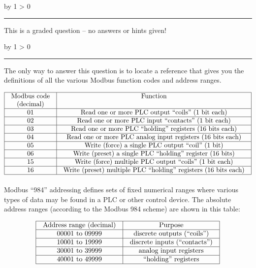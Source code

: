 \documentclass[12pt,a4paper]{article}
\def\svar{
           \advance\answnum by 1
           \ifnum \answnum > 0
                \hrule
                \vskip 3pt
                \leftline{Svar \the\answnum}
                \vskip 3pt \fi}
\def\notes{
           \advance\explnum by 1
           \ifnum \explnum > 0
                \hrule
                \vskip 3pt
                \leftline{Notes \the\explnum}
                \vskip 3pt \fi}
\begin{document}
\vfil
{}
\eject
\vskip 10pt \filbreak 





\svar{} 

This is a graded question -- no answers or hints given!

\vskip 10pt \filbreak 





\notes{} 

The only way to answer this question is to locate a reference that gives you the definitions of all the various Modbus function codes and address ranges.


$$\vbox{\offinterlineskip
\halign{\strut
\vrule \quad\hfil # \ \hfil & 
\vrule \quad\hfil # \ \hfil \vrule \cr
\noalign{\hrule}
%
Modbus code & Function \cr
(decimal) &  \cr
%
\noalign{\hrule}
%
01 & Read one or more PLC output ``coils'' (1 bit each) \cr
%
\noalign{\hrule}
%
02 & Read one or more PLC input ``contacts'' (1 bit each) \cr
%
\noalign{\hrule}
%
03 & Read one or more PLC ``holding'' registers (16 bits each) \cr
%
\noalign{\hrule}
%
04 & Read one or more PLC analog input registers (16 bits each) \cr
%
\noalign{\hrule}
%
05 & Write (force) a single PLC output ``coil'' (1 bit) \cr
%
\noalign{\hrule}
%
06 & Write (preset) a single PLC ``holding'' register (16 bits) \cr
%
\noalign{\hrule}
%
15 & Write (force) multiple PLC output ``coils'' (1 bit each) \cr
%
\noalign{\hrule}
%
16 & Write (preset) multiple PLC ``holding'' registers (16 bits each) \cr
%
\noalign{\hrule}
} %
}$$ %

\vskip 10pt

Modbus ``984'' addressing defines sets of fixed numerical ranges where various types of data may be found in a PLC or other control device.  The absolute address ranges (according to the Modbus 984 scheme) are shown in this table: 


$$\vbox{\offinterlineskip
\halign{\strut
\vrule \quad\hfil # \ \hfil & 
\vrule \quad\hfil # \ \hfil \vrule \cr
\noalign{\hrule}
%
Address range (decimal) & Purpose \cr
%
\noalign{\hrule}
%
00001 to 09999 & discrete outputs (``coils'') \cr
%
\noalign{\hrule}
%
10001 to 19999 & discrete inputs (``contacts'') \cr
%
\noalign{\hrule}
%
30001 to 39999 & analog input registers \cr
%
\noalign{\hrule}
%
40001 to 49999 & ``holding'' registers \cr
%
\noalign{\hrule}
} %
}$$ %
\end{document}
